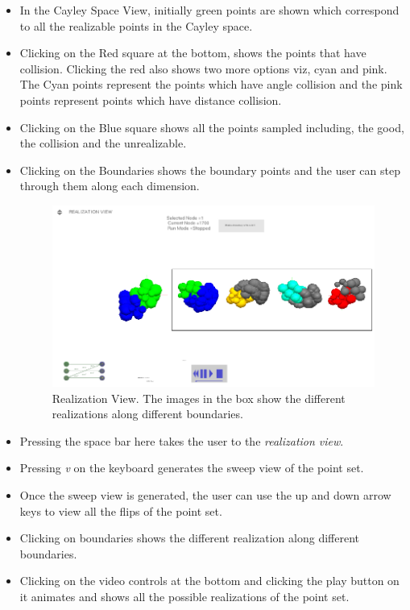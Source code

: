 \documentclass[10pt]{article}
\begin{document}
\begin{itemize}
\item In the Cayley Space View, initially green points are shown which
		correspond to all the realizable points in the Cayley space.

\item Clicking on the Red square at the bottom, shows the points that have
		collision. Clicking the red also shows two more options viz, cyan and
		pink. The Cyan points represent the points which have angle collision
		and the pink points represent points which have distance collision.

\item Clicking on the Blue square shows all the points sampled including, the
		good, the collision and the unrealizable.

\item Clicking on the Boundaries shows the boundary points and the user can
		step through them along each dimension.

\begin{figure}
	\centering
	\includegraphics[scale=0.5] {fig/RealizationView.png}
	\caption{Realization View. The images in the box show the different
		realizations along different boundaries.}
		\label{realizationview}
\end{figure}

\item Pressing the space bar here takes the user to the \emph{realization view}.

\item Pressing \emph{v} on the keyboard generates the sweep view of the point set.

\item Once the sweep view is generated, the user can use the up and down arrow
		keys to view all the flips of the point set.

\item Clicking on boundaries shows the different realization along different
		boundaries.

\item Clicking on the video controls at the bottom and clicking the play button
		on it animates and shows all the possible realizations of the point set.
\end{itemize}








\end{document}
